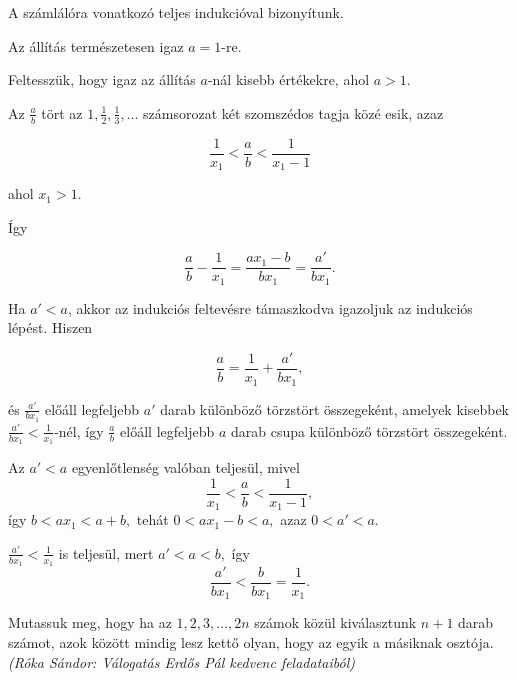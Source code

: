 \begin{solution}
A számlálóra vonatkozó teljes indukcióval bizonyítunk.

Az állítás természetesen igaz $a=1$-re.

Feltesszük, hogy igaz az állítás $a$-nál kisebb értékekre, ahol $a>1$.

Az $\frac{a}{b}$ tört az $1,\frac{1}{2},\frac{1}{3},\dots$ számsorozat
két szomszédos tagja közé esik, azaz

\[
\frac{1}{x_{1}}<\frac{a}{b}<\frac{1}{x_{1}-1}
\]

ahol $x_{1}>1$.

Így

\[
\frac{a}{b}-\frac{1}{x_{1}}=\frac{ax_{1}-b}{bx_{1}}=\frac{a'}{bx_{1}}.
\]

Ha $a'<a$, akkor az indukciós feltevésre támaszkodva igazoljuk az
indukciós lépést. Hiszen

\[
\frac{a}{b}=\frac{1}{x_{1}}+\frac{a'}{bx_{1}},
\]

és $\frac{a'}{bx_{1}}$ előáll legfeljebb $a'$ darab különböző törzstört
összegeként, amelyek kisebbek $\frac{a'}{bx_{1}}<\frac{1}{x_{1}}$-nél,
így $\frac{a}{b}$ előáll legfeljebb $a$ darab csupa különböző törzstört
összegeként.

Az $a'<a$ egyenlőtlenség valóban teljesül, mivel 
\[
\frac{1}{x_{1}}<\frac{a}{b}<\frac{1}{x_{1}-1},
\]
így $b<ax_{1}<a+b,$ tehát $0<ax_{1}-b<a,$ azaz $0<a'<a.$

$\frac{a'}{bx_{1}}<\frac{1}{x_{1}}$ is teljesül, mert $a'<a<b,$
így 
\[
\frac{a'}{bx_{1}}<\frac{b}{bx_{1}}=\frac{1}{x_{1}}.
\]
\end{solution}
\begin{extraproblem}
Mutassuk meg, hogy ha az $1,2,3,\dots,2n$ számok közül kiválasztunk
$n+1$ darab számot, azok között mindig lesz kettő olyan, hogy az
egyik a másiknak osztója. \emph{(Róka Sándor: Válogatás Erdős Pál
kedvenc feladataiból) }
\end{extraproblem}

